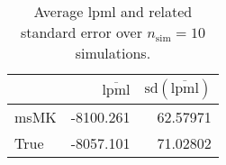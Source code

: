\begin{table}[H]

\caption{Average lpml and related standard error over $n_{\text{sim}} = 10$ simulations.}
\centering
\begin{tabular}[t]{lrr}
\toprule
  & $\overbar{\text{lpml}}$ & $\text{sd}(\overbar{\text{lpml}})$\\
\midrule
msMK & -8100.261 & 62.57971\\
True & -8057.101 & 71.02802\\
\bottomrule
\end{tabular}
\end{table}